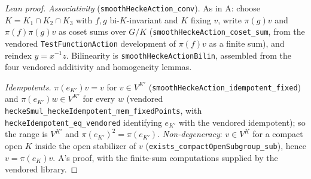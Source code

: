 \begin{proof}[Lean proof]
\emph{Associativity} (\texttt{smoothHeckeAction\_conv}). As in A: choose $K=K_1\cap K_2\cap K_3$ with $f,g$ bi-$K$-invariant and $K$ fixing $v$, write $\pi(g)v$ and $\pi(f)\pi(g)v$ as coset sums over $G/K$ (\texttt{smoothHeckeAction\_coset\_sum}, from the vendored \texttt{TestFunctionAction} development of $\pi(f)v$ as a finite sum), and reindex $y=x^{-1}z$. Bilinearity is \texttt{smoothHeckeActionBilin}, assembled from the four vendored additivity and homogeneity lemmas.

\emph{Idempotents.} $\pi(e_{K'})v=v$ for $v\in V^{K'}$ (\texttt{smoothHeckeAction\_idempotent\_fixed}) and $\pi(e_{K'})w\in V^{K'}$ for every $w$ (vendored \texttt{heckeSmul\_heckeIdempotent\_mem\_fixedPoints}, with \texttt{heckeIdempotent\_eq\_vendored} identifying $e_{K'}$ with the vendored idempotent); so the range is $V^{K'}$ and $\pi(e_{K'})^2=\pi(e_{K'})$. \emph{Non-degeneracy}: $v\in V^{K}$ for a compact open $K$ inside the open stabilizer of $v$ (\texttt{exists\_compactOpenSubgroup\_sub}), hence $v=\pi(e_K)v$. A's proof, with the finite-sum computations supplied by the vendored library.
\end{proof}

